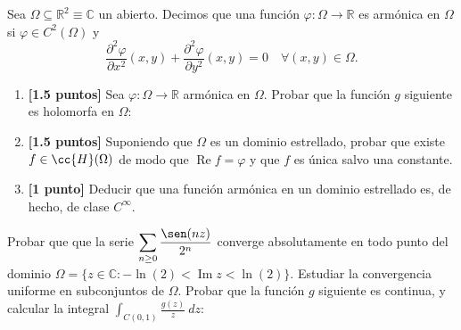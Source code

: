 \documentclass[12pt]{article}
\renewcommand{\Re}{\operatorname{Re}} %
\renewcommand{\Im}{\operatorname{Im}}
\begin{document}
    \begin{ejercicio}
        Sea $\Omega\subseteq \mathbb{R}^2 \equiv\mathbb{C}$ un abierto. Decimos que una función $\varphi:\Omega\to\mathbb{R}$ es armónica en $\Omega$ si $\varphi \in C^2(\Omega)$ y
        \begin{equation*}
            \frac{\partial^2 \varphi}{\partial x^2}(x,y)+\frac{\partial^2 \varphi}{\partial y^2}(x,y) = 0 \quad \forall (x,y) \in \Omega.
        \end{equation*}
        \begin{enumerate}
            \item \textbf{[1.5 puntos]} Sea $\varphi:\Omega\to\mathbb{R}$ armónica en $\Omega$. Probar que la función $g$ siguiente es holomorfa en $\Omega$:
            \item \textbf{[1.5 puntos]} Suponiendo que $\Omega$ es un dominio estrellado, probar que existe $f \in \cc{H}(\Omega)$ de modo que $\Re f = \varphi$ y que $f$ es única salvo una constante.
            \item \textbf{[1 punto]} Deducir que una función armónica en un dominio estrellado es, de hecho, de clase $C^{\infty}$.
        \end{enumerate}
    \end{ejercicio}

    \newpage
    \setcounter{ejercicio}{0}

    \begin{ejercicio}[4 puntos]
        Probar que que la serie $\displaystyle \sum_{n\geq 0} \frac{\sen(nz)}{2^n}$ converge absolutamente en todo punto del dominio $\Omega=\{z \in \mathbb{C} : -\ln(2) < \Im z < \ln(2)\}$. Estudiar la convergencia uniforme en subconjuntos de $\Omega$. Probar que la función $g$ siguiente es continua, y calcular la integral $\displaystyle \int_{C(0,1)} \frac{g(z)}{z}\ dz$:
    \end{ejercicio}
\end{document}
